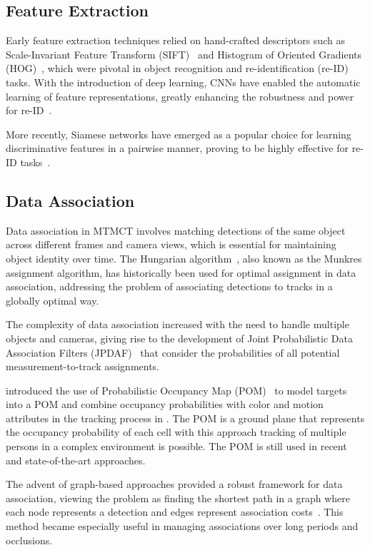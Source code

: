 \subsection{Feature Extraction}\label{subsec:milestone:eature_extraction}
Early feature extraction techniques relied on hand-crafted descriptors such as Scale-Invariant Feature Transform (SIFT)~\cite{Lowe04} and Histogram of Oriented Gradients (HOG)~\cite{Dalal05}, which were pivotal in object recognition and re-identification (re-ID) tasks. With the introduction of deep learning, CNNs have enabled the automatic learning of feature representations, greatly enhancing the robustness and power for re-ID~\cite{Krizhevsky12, He16}.

More recently, Siamese networks have emerged as a popular choice for learning discriminative features in a pairwise manner, proving to be highly effective for re-ID tasks~\cite{Varior16}.

\subsection{Data Association}\label{subsec:milestone_data_association}
Data association in MTMCT involves matching detections of the same object across different frames and camera views, which is essential for maintaining object identity over time. The Hungarian algorithm~\cite{Kuhn55}, also known as the Munkres assignment algorithm, has historically been used for optimal assignment in data association, addressing the problem of associating detections to tracks in a globally optimal way.

The complexity of data association increased with the need to handle multiple objects and cameras, giving rise to the development of Joint Probabilistic Data Association Filters (JPDAF)~\cite{Fortmann83} that consider the probabilities of all potential measurement-to-track assignments.

\citeauthor{Fleuret08} introduced the use of Probabilistic Occupancy Map (POM)~\cite{Fleuret08} to model targets into a POM and combine occupancy probabilities with color and motion attributes in the tracking process in \citeyear{Fleuret08}. The POM is a ground plane that represents the occupancy probability of each cell with this approach tracking of multiple persons in a complex environment is possible. The POM is still used in recent and state-of-the-art approaches.

The advent of graph-based approaches provided a robust framework for data association, viewing the problem as finding the shortest path in a graph where each node represents a detection and edges represent association costs~\cite{Zhang08}. This method became especially useful in managing associations over long periods and occlusions.

